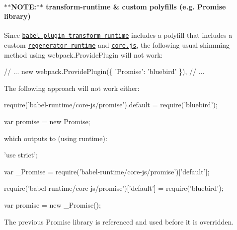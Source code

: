 

\paragraph*{$\ast$$\ast$\+N\+O\+TE\+:$\ast$$\ast$ transform-\/runtime \& custom polyfills (e.\+g. Promise library)}

Since \href{https://github.com/babel/babel/tree/master/packages/babel-plugin-transform-runtime}{\tt babel-\/plugin-\/transform-\/runtime} includes a polyfill that includes a custom \href{https://github.com/facebook/regenerator/blob/master/packages/regenerator-runtime/runtime.js}{\tt regenerator runtime} and \href{https://github.com/zloirock/core-js}{\tt core.\+js}, the following usual shimming method using {\ttfamily webpack.\+Provide\+Plugin} will not work\+:


\begin{DoxyCode}
// ...
        new webpack.ProvidePlugin(\{
            'Promise': 'bluebird'
        \}),
// ...
\end{DoxyCode}


The following approach will not work either\+:


\begin{DoxyCode}
require('babel-runtime/core-js/promise').default = require('bluebird');

var promise = new Promise;
\end{DoxyCode}


which outputs to (using {\ttfamily runtime})\+:


\begin{DoxyCode}
'use strict';

var \_Promise = require('babel-runtime/core-js/promise')['default'];

require('babel-runtime/core-js/promise')['default'] = require('bluebird');

var promise = new \_Promise();
\end{DoxyCode}


The previous {\ttfamily Promise} library is referenced and used before it is overridden.


